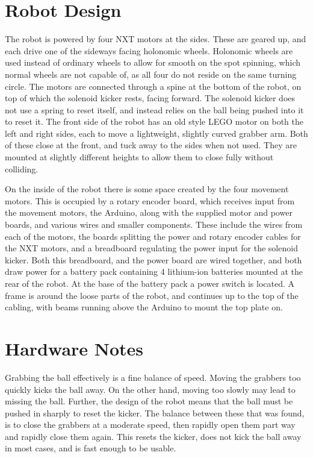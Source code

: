 \section{Robot Design}

The robot is powered by four NXT motors at the sides. These are geared up, and
each drive one of the sideways facing holonomic wheels. Holonomic wheels are
used instead of ordinary wheels to allow for smooth on the spot spinning, which
normal wheels are not capable of, as all four do not reside on the same turning
circle. The motors are connected through a spine at the bottom of the robot,
on top of which the solenoid kicker rests, facing forward. The solenoid kicker
does not use a spring to reset itself, and instead relies on the ball being
pushed into it to reset it. The front side of the robot has an old style LEGO
motor on both the left and right sides, each to move a lightweight, slightly
curved grabber arm. Both of these close at the front, and tuck away to the
sides when not used. They are mounted at slightly different heights to allow
them to close fully without colliding.

On the inside of the robot there is some space created by the four movement
motors. This is occupied by a rotary encoder board, which receives input from
the movement motors, the Arduino, along with the supplied motor and power
boards, and various wires and smaller components. These include the wires from
each of the motors, the boards splitting the power and rotary encoder cables
for the NXT motors, and a breadboard regulating the power input for the
solenoid kicker. Both this breadboard, and the power board are wired together,
and both draw power for a battery pack containing 4 lithium-ion batteries
mounted at the rear of the robot. At the base of the battery pack a power
switch is located. A frame is around the loose parts of the robot, and
continues up to the top of the cabling, with beams running above the Arduino to
mount the top plate on.

\section{Hardware Notes}

Grabbing the ball effectively is a fine balance of speed. Moving the grabbers
too quickly kicks the ball away. On the other hand, moving too slowly may lead
to missing the ball. Further, the design of the robot means that the ball must
be pushed in sharply to reset the kicker. The balance between these that was
found, is to close the grabbers at a moderate speed, then rapidly open them
part way and rapidly close them again. This resets the kicker, does not kick
the ball away in most cases, and is fast enough to be usable.

